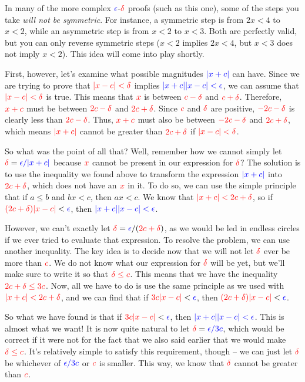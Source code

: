 \documentclass{myarticle}
\newcommand{\hor}[1]{\textcolor{red}{#1}}
\newcommand{\ver}[1]{\textcolor{blue}{#1}}
\theoremstyle{nospace}
\newtheorem{old series theorem}{Theorem}
\newenvironment{series theorem}
{\begin{mdframed}\begin{old series theorem}}
    {\end{old series theorem}\end{mdframed}}
\begin{document}
In many of the more complex $\ver{\epsilon}$-$\hor{\delta}$ proofs
(such as this one), some of the steps you take \emph{will not be
  symmetric}. For instance, a symmetric step is from $2x < 4$ to
$x < 2$, while an asymmetric step is from $x < 2$ to $x < 3$. Both are
perfectly valid, but you can only reverse symmetric steps ($x < 2$
implies $2x < 4$, but $x < 3$ does not imply $x < 2$). This idea will
come into play shortly.

First, however, let's examine what possible magnitudes $\ver{|x + c|}$
can have. Since we are trying to prove that $\hor{|x - c| < \delta}$
implies $\ver{|x + c||x - c| < \epsilon}$, we can assume that
$\hor{|x - c| < \delta}$ is true. This means that $\hor{x}$ is between
$\hor{c - \delta}$ and $\hor{c + \delta}$. Therefore, $\hor{x + c}$
must be between $\hor{2c - \delta}$ and $\hor{2c + \delta}$. Since
$\hor{c}$ and $\hor{\delta}$ are positive, $\hor{-2c - \delta}$ is
clearly less than $\hor{2c - \delta}$. Thus, $\hor{x + c}$ must also
be between $\hor{-2c - \delta}$ and $\hor{2c + \delta}$, which means
$\hor{|x + c|}$ cannot be greater than $\hor{2c + \delta}$ if
$\hor{|x - c| < \delta}$.

So what was the point of all that? Well, remember how we cannot simply
let $\hor{\delta} = \ver{\epsilon/|x + c|}$ because $\hor{x}$ cannot
be present in our expression for $\hor{\delta}$? The solution is to
use the inequality we found above to transform the expression
$\ver{|x + c|}$ into $\hor{2c + \delta}$, which does not have an
$\hor{x}$ in it. To do so, we can use the simple principle that if
$a \leq b$ and $bx < c$, then $ax < c$. We know that
$\hor{|x + c| < 2c + \delta}$, so if
$\hor{(2c + \delta)|x - c|} < \ver{\epsilon}$, then
$\ver{|x + c||x - c| < \epsilon}$.

However, we can't exactly let
$\hor{\delta} = \ver{\epsilon}/(\hor{2c + \delta})$, as we would be
led in endless circles if we ever tried to evaluate that expression.
To resolve the problem, we can use another inequality. The key idea is
to decide now that we will not let $\hor{\delta}$ ever be more than
$\hor{c}$. We do not know what our expression for $\hor{\delta}$ will
be yet, but we'll make sure to write it so that $\hor{\delta \leq c}$.
This means that we have the inequality $\hor{2c + \delta \leq 3c}$.
Now, all we have to do is use the same principle as we used with
$\hor{|x + c| < 2c + \delta}$, and we can find that if
$\hor{3c|x - c|} < \ver{\epsilon}$, then
$\hor{(2c + \delta)|x - c|} < \ver{\epsilon}$.

So what we have found is that if $\hor{3c|x - c|} < \ver{\epsilon}$,
then $\ver{|x + c||x - c| < \epsilon}$. This is almost what we want!
It is now quite natural to let $\hor{\delta} = \ver{\epsilon/3c}$,
which would be correct if it were not for the fact that we also said
earlier that we would make $\hor{\delta \leq c}$. It's relatively
simple to satisfy this requirement, though -- we can just let
$\hor{\delta}$ be whichever of $\ver{\epsilon/3c}$ or $\hor{c}$ is
smaller. This way, we know that $\hor{\delta}$ cannot be greater than
$\hor{c}$.
\end{document}
